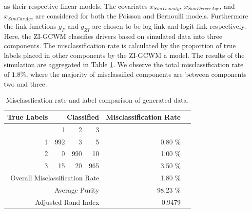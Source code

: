 \documentclass[12pt,letterpaper]{article}
\numberwithin{equation}{section}
\numberwithin{equation}{section}
\numberwithin{equation}{section}
\begin{document}
as their respective linear models.  The covariates $x_{SimDensity}$, $x_{SimDriverAge}$, and $x_{SimCarAge}$ are considered for both the Poisson and Bernoulli models. Furthermore the link functions $g_P$ and $g_{ZI}$ are chosen to be log-link and logit-link respectively. 
 Here, the ZI-GCWM classifies drivers based on simulated data into three components. The misclassification rate is calculated by the proportion of true labels placed in other components by the ZI-GCWM a model.  The results of the simulation are aggregated in Table \ref{misclassTable}. We observe the total misclassification rate of $1.8 \% $, where the majority of misclassified components are between components two and three.
\begin{table}[!htb]
\begin{center}
\caption{Misclassfication rate and label comparison of generated data.}
\label{misclassTable}
\begin{tabular}{r| r r r| r r}
\hline
    True Labels       &  \multicolumn{3}{r}{ Classified }  \vline & Misclassification Rate  &  \\ \hline
   & 1                              & 2   & 3   &                            &  \\ \hline
 1              & 992                            & 3   & 5   & 0.80 \%                                      &  \\
 2              & 0                              & 990 & 10  & 1.00 \%                                       &  \\
 3              & 15                             & 20  & 965 & 3.50 \%                                      &  \\  \hline
                \multicolumn{4}{r}{Overall Misclassification Rate}        & 1.80 \%                  & \\
        		\multicolumn{4}{r}{Average Purity} & 98.23 \%  
        		\\ \hline
                \multicolumn{4}{r}{Adjusted Rand Index} & 0.9479 &  \\
    \hline
\end{tabular}
\end{center}
\end{table}
\end{document}
